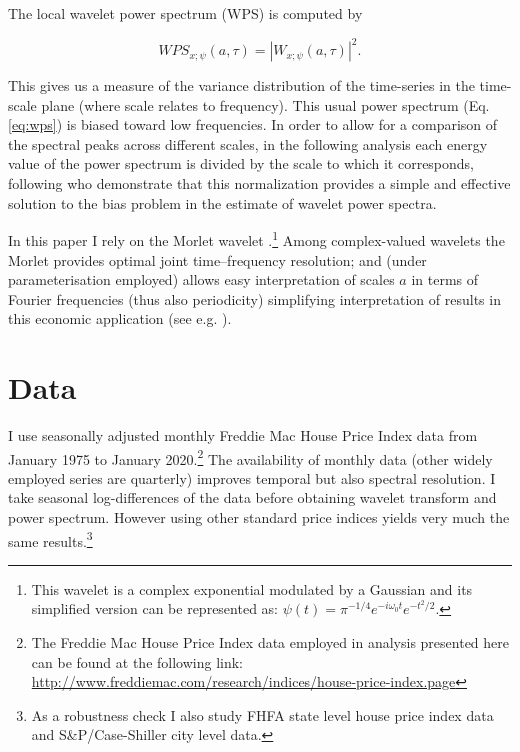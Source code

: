 \documentclass[11pt]{article}
\begin{document}
The local wavelet power spectrum (WPS) is computed by

\begin{equation}
 WPS_{x;\psi}(a,\tau)=|W_{x;\psi}(a,\tau)|^2.
 \label{eq:wps}
\end{equation}

This gives us a measure of the variance distribution of the time-series in the time-scale plane (where scale relates to frequency). This usual power spectrum (Eq.\ref{eq:wps}) is biased toward low frequencies. In order to allow for a comparison of the spectral peaks across different scales, in the following analysis each energy value of the power spectrum is divided by the scale to which it corresponds, following \cite{Liu2007} who demonstrate that this normalization provides a simple and effective solution to the bias problem in the estimate of wavelet power spectra.


In this paper I rely on the Morlet wavelet \citep{Goupillaud1984}.\footnote{This wavelet is a complex exponential modulated by a Gaussian and its simplified version can be represented as: $\psi(t)=\pi^{-1/4}e^{-i\omega_{0}t}e^{-t^2/2}$.} Among complex-valued wavelets the Morlet provides optimal joint time–frequency resolution; and (under  parameterisation employed)  allows easy interpretation of scales $a$ in terms of Fourier frequencies (thus also periodicity) simplifying interpretation of results in this economic application (see e.g. \cite{Aguiar-Conraria2014}).


\section{Data} \label{Data}

I use seasonally adjusted monthly Freddie Mac House Price Index data from January 1975 to January 2020.\footnote{The Freddie Mac House Price Index data employed in analysis presented here can be found at the following link: \url{http://www.freddiemac.com/research/indices/house-price-index.page}} The availability of monthly data (other widely employed series are quarterly) improves temporal but also spectral resolution. I take seasonal log-differences of the data before obtaining wavelet transform and power spectrum. However using other standard price indices yields very much the same results.\footnote{As a robustness check I also study FHFA state level house price index data and S\&P/Case-Shiller city level data.}
\end{document}
